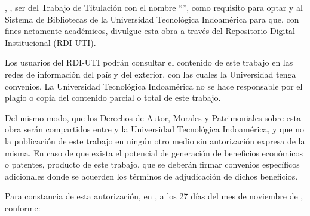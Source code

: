 
\UTIAutoresPronombre, \UTIAutoresTexto, \UTIVerboDeclaro{} ser \UTIAutorEtiquetaMin{} del Trabajo de Titulación con el nombre ``\UTITituloProyecto'', como requisito para optar \UTIFraseOptarTituloProfesional{} y \UTIVerboAutorizo{} al Sistema de Bibliotecas de la Universidad Tecnológica Indoamérica para que, con fines netamente académicos, divulgue esta obra a través del Repositorio Digital Institucional (RDI-UTI).

Los usuarios del RDI-UTI podrán consultar el contenido de este trabajo en las redes de información del país y del exterior, con las cuales la Universidad tenga convenios. La Universidad Tecnológica Indoamérica no se hace responsable por el plagio o copia del contenido parcial o total de este trabajo.
	        
Del mismo modo, \UTIVerboAcepto{} que los Derechos de Autor, Morales y Patrimoniales sobre esta obra serán compartidos entre \UTIAutoresPoseedor{} y la Universidad Tecnológica Indoamérica, y que no \UTIVerboTramito{} la publicación de este trabajo en ningún otro medio sin autorización expresa de la misma. En caso de que exista el potencial de generación de beneficios económicos o patentes, producto de este trabajo, \UTIVerboAcepto{} que se deberán firmar convenios específicos adicionales donde se acuerden los términos de adjudicación de dichos beneficios.

Para constancia de esta autorización, en \UTICiudadPais, a los 27 días del mes de noviembre de \UTIAnio, \UTIVerboFirmo{} conforme:

\vspace{1cm}

\UTIRepositorioAutoresBloque
